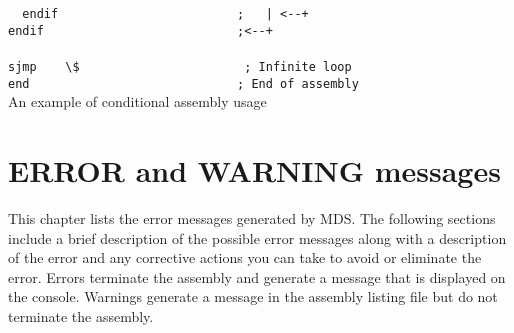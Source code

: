 {\begin{code}[h!]
                        \verb'  '{\color{highlight_directive}\verb'endif'}\verb'                         '{\color{highlight_comment}\verb';   | <--+'}\\
                        {\color{highlight_directive}\verb'endif'}\verb'                           '{\color{highlight_comment}\verb';<--+'}\\
                        \verb''\\
                        {\color{highlight_instruction}\verb'sjmp'}\verb'    '{\color{highlight_constant}\verb'\$'}\verb'                       '{\color{highlight_comment}\verb'; Infinite loop'}\\
                        {\color{highlight_directive}\verb'end'}\verb'                             '{\color{highlight_comment}\verb'; End of assembly'}\\
                        \caption{An example of conditional assembly usage}
                \end{code}


                \clearpage
        \section{ERROR and WARNING messages}
        This chapter lists the error messages generated by MDS. The following sections
        include a brief description of the possible error messages along with a
        description of the error and any corrective actions you can take to avoid or
        eliminate the error. Errors terminate the assembly and generate a message that is displayed on
        the console. Warnings generate a message in the assembly listing file but do not terminate the assembly.
}
